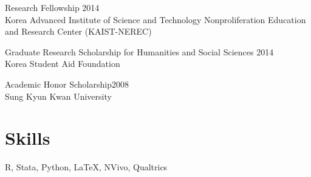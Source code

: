 \documentclass[margin,line, 10pt]{res}
\begin{document}
\begin{resume}
\vspace*{-2.5mm}
Research Fellowship \hfill 2014\\
Korea Advanced Institute of Science and Technology Nonproliferation Education and Research Center (KAIST-NEREC)

\vspace*{-2.5mm}
Graduate Research Scholarship for Humanities and Social Sciences \hfill 2014\\
Korea Student Aid Foundation

\vspace*{-2.5mm}
Academic Honor Scholarship\hfill 2008\\
Sung Kyun Kwan University 


\section{\sc Skills} 
R, Stata, Python, \LaTeX, NVivo, Qualtrics




\end{resume}
\thispagestyle{lastpage}
\end{document}
